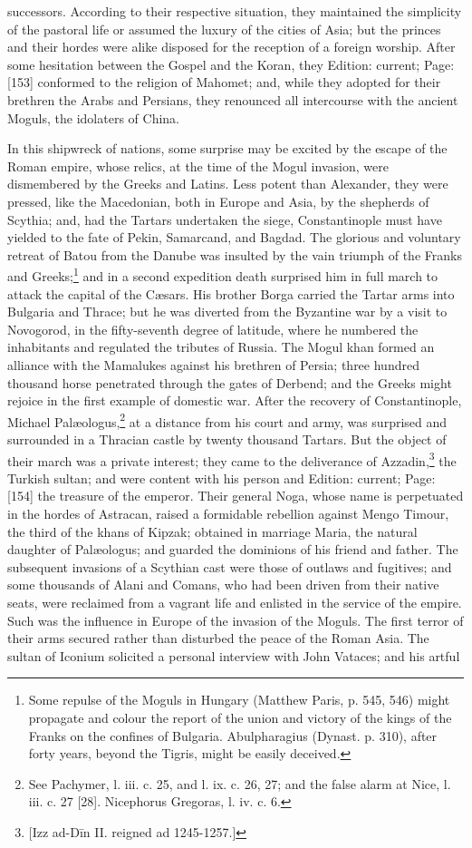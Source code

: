 successors. According to their respective situation, they maintained the simplicity of the pastoral life or assumed the luxury of the cities of Asia; but the princes and their hordes were alike disposed for the reception of a foreign worship. After some hesitation between the Gospel and the Koran, they Edition: current; Page: [153] conformed to the religion of Mahomet; and, while they adopted for their brethren the Arabs and Persians, they renounced all intercourse with the ancient Moguls, the idolaters of China.

In this shipwreck of nations, some surprise may be excited by the escape of the Roman empire, whose relics, at the time of the Mogul invasion, were dismembered by the Greeks and Latins. Less potent than Alexander, they were pressed, like the Macedonian, both in Europe and Asia, by the shepherds of Scythia; and, had the Tartars undertaken the siege, Constantinople must have yielded to the fate of Pekin, Samarcand, and Bagdad. The glorious and voluntary retreat of Batou from the Danube was insulted by the vain triumph of the Franks and Greeks;\footnote{Some repulse of the Moguls in Hungary (Matthew Paris, p. 545, 546) might propagate and colour the report of the union and victory of the kings of the Franks on the confines of Bulgaria. Abulpharagius (Dynast. p. 310), after forty years, beyond the Tigris, might be easily deceived.} and in a second expedition death surprised him in full march to attack the capital of the Cæsars. His brother Borga carried the Tartar arms into Bulgaria and Thrace; but he was diverted from the Byzantine war by a visit to Novogorod, in the fifty-seventh degree of latitude, where he numbered the inhabitants and regulated the tributes of Russia. The Mogul khan formed an alliance with the Mamalukes against his brethren of Persia; three hundred thousand horse penetrated through the gates of Derbend; and the Greeks might rejoice in the first example of domestic war. After the recovery of Constantinople, Michael Palæologus,\footnote{See Pachymer, l. iii. c. 25, and l. ix. c. 26, 27; and the false alarm at Nice, l. iii. c. 27 [28]. Nicephorus Gregoras, l. iv. c. 6.} at a distance from his court and army, was surprised and surrounded in a Thracian castle by twenty thousand Tartars. But the object of their march was a private interest; they came to the deliverance of Azzadin,\footnote{[Izz ad-Dīn II. reigned ad 1245-1257.]} the Turkish sultan; and were content with his person and Edition: current; Page: [154] the treasure of the emperor. Their general Noga, whose name is perpetuated in the hordes of Astracan, raised a formidable rebellion against Mengo Timour, the third of the khans of Kipzak; obtained in marriage Maria, the natural daughter of Palæologus; and guarded the dominions of his friend and father. The subsequent invasions of a Scythian cast were those of outlaws and fugitives; and some thousands of Alani and Comans, who had been driven from their native seats, were reclaimed from a vagrant life and enlisted in the service of the empire. Such was the influence in Europe of the invasion of the Moguls. The first terror of their arms secured rather than disturbed the peace of the Roman Asia. The sultan of Iconium solicited a personal interview with John Vataces; and his artful 